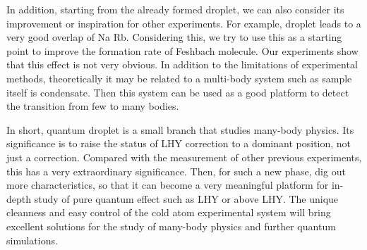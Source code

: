 In addition, starting from the already formed droplet, we can also consider its improvement or inspiration for other experiments. For example, droplet leads to a very good overlap of Na Rb. Considering this, we try to use this as a starting point to improve the formation rate of Feshbach molecule. Our experiments show that this effect is not very obvious. In addition to the limitations of experimental methods, theoretically it may be related to a multi-body system such as sample itself is condensate. Then this system can be used as a good platform to detect the transition from few to many bodies.

In short, quantum droplet is a small branch that studies many-body physics. Its significance is to raise the status of LHY correction to a dominant position, not just a correction. Compared with the measurement of other previous experiments, this has a very extraordinary significance. Then, for such a new phase, dig out more characteristics, so that it can become a very meaningful platform for in-depth study of pure quantum effect such as LHY or above LHY. The unique cleanness and easy control of the cold atom experimental system will bring excellent solutions for the study of many-body physics and further quantum simulations.

\chapterend

